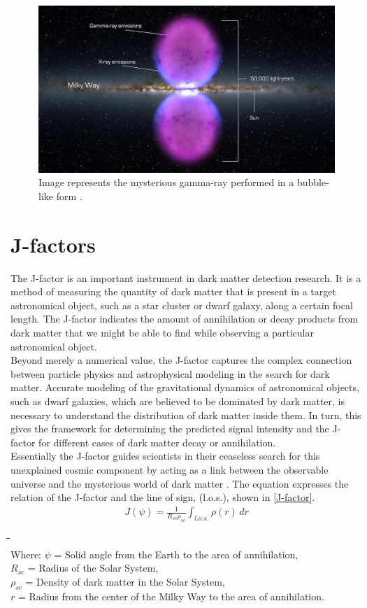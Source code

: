 \documentclass[10pt, oneside]{book}
\numberwithin{equation}{chapter}
\begin{document}
\begin{figure}
    \centering
    \includegraphics[width=0.5\linewidth]{images/Buble of gamma-ray.jpg}
    \caption{Image represents the mysterious gamma-ray performed in a bubble-like form \cite{alvarezhurtado2019correlation}.}
    \label{fig: Bubble of gamma-ray}
\end{figure}

\section{J-factors}
The J-factor is an important instrument in dark matter detection research. It is a method of measuring the quantity of dark matter that is present in a target astronomical object, such as a star cluster or dwarf galaxy, along a certain focal length. The J-factor indicates the amount of annihilation or decay products from dark matter that we might be able to find while observing a particular astronomical object.\\
\indent Beyond merely a numerical value, the J-factor captures the complex connection between particle physics and astrophysical modeling in the search for dark matter. Accurate modeling of the gravitational dynamics of astronomical objects, such as dwarf galaxies, which are believed to be dominated by dark matter, is necessary to understand the distribution of dark matter inside them. In turn, this gives the framework for determining the predicted signal intensity and the J-factor for different cases of dark matter decay or annihilation.\\
\indent Essentially the J-factor guides scientists in their ceaseless search for this unexplained cosmic component by acting as a link between the observable universe and the mysterious world of dark matter \cite{Marco_Cirelli_2011}. The equation expresses the relation of the J-factor and the line of sign, (l.o.s.), shown in \autoref{J-factor}.
\begin{eqnarray}\label{J-factor}
    J\left(\psi\right) = \frac{1}{R_{sc}\rho_{sc}} \int_{l.o.s.} \rho\left(r\right) \,dr
\end{eqnarray}
\begin{tabbing}
    \indent\= \indent \= \indent \= \indent \= \indent\= \\
    Where:
    \>\>\> $\psi$ \> = \> Solid angle from the Earth to the area of annihilation,\\
    \>\>\> $R_{sc}$ \> = \> Radius of the Solar System,\\
    \>\>\> $\rho_{sc}$ \> = \> Density of dark matter in the Solar System,\\
    \>\>\> $r$ \> = \> Radius from the center of the Milky Way to the area of annihilation.\\
\end{tabbing}
\end{document}

